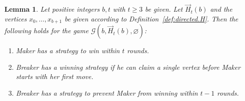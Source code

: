 \documentclass[reqno, 12pt]{amsart}
\numberwithin{equation}{section}
\numberwithin{figure}{section}
\newtheorem{lemma}[theorem]{Lemma}
\begin{document}
\begin{lemma} \label{lem:game.directed.H}
Let positive integers $b,t$ with $t\geq 3$ be given.
Let $\vec{H}_t(b)$ and the vertices
$x_0,\ldots,x_{b+1}$ be given according to Definition~\ref{def:directed.H}. 
Then the following holds for the game 
$\mathcal{G}(b,\vec{H}_t(b),\varnothing)$:
\begin{enumerate}
		\item Maker has a strategy to win within $t$ rounds.
		\item Breaker has a winning strategy if he can claim a single vertex before Maker starts with her first move.
		\item Breaker has a strategy to prevent Maker from winning within $t-1$ rounds.
	\end{enumerate}
\end{lemma}
\end{document}
